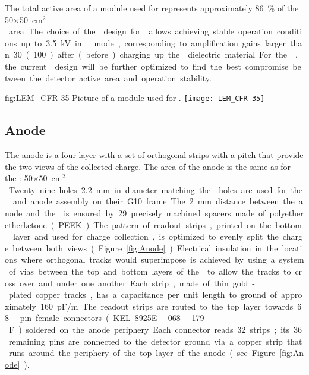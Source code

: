 The total active area of a  module used for   represents approximately \SI{86}{\%} of the \num{50}$\times$\SI{50}{cm$^{2}$} area. The choice of the  design for  allows achieving stable operation conditions up to \SI{3.5}{kV} in   mode, corresponding to amplification gains larger than \num{30} (\num{100}) after (before) charging up the  dielectric material. For the , the current  design will be further optimized to find the best compromise between the detector active area and operation stability.

\begin{dunefigure}
{fig:LEM_CFR-35}
{Picture of a  module used for  .}
\texttt{[image: LEM\_CFR-35]}
\end{dunefigure}

\subsection{Anode}
\label{sec:fddp-crp-anode}
 
The anode is a four-layer  with a set of orthogonal strips with a \dpstrippitch pitch that provide the two views of the collected charge. The area of the anode is the same as for the :  \num{50}$\times$\SI{50}{cm$^2$}. Twenty nine holes \SI{2.2}{mm} in diameter matching the  holes are used for the  and anode assembly on their G10 frame. The \SI{2}{mm} distance between the anode and the  is ensured by \num{29} precisely machined spacers made of polyetheretherketone (PEEK). 

The pattern of readout strips, printed on the bottom  layer and used for charge collection, is optimized to evenly split the charge between both views (Figure~\ref{fig:Anode}). Electrical insulation in the locations where orthogonal tracks would superimpose is achieved by 
using a system of vias between the top and bottom layers of the  to allow the tracks to cross over and under one another. 
Each strip, made of thin gold-plated copper tracks, has a capacitance per unit length to ground of approximately 
\SI{160}{pF/m}. The readout strips are routed to the top layer towards \num{68}-pin female connectors (KEL 8925E-068-179-F) soldered on the anode periphery. Each connector reads \num{32} strips; its \num{36} remaining pins are connected to the detector ground via a copper strip that runs around the periphery of the top layer of the anode (see Figure \ref{fig:Anode}). %

